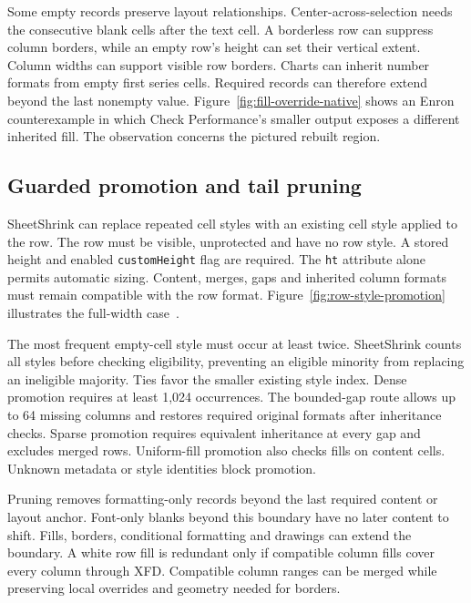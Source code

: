 Some empty records preserve layout relationships. Center-across-selection needs
the consecutive blank cells after the text cell. A borderless row can suppress
column borders, while an empty row's height can set their vertical extent. Column
widths can support visible row borders. Charts can inherit number formats from
empty first series cells. Required records can therefore extend beyond the last
nonempty value.
Figure~\ref{fig:fill-override-native} shows an Enron counterexample in which
Check Performance's smaller output exposes a different inherited fill. The
observation concerns the pictured rebuilt region.


\subsection{Guarded promotion and tail pruning}
SheetShrink can replace repeated cell styles with an existing cell style applied
to the row. The row must be visible, unprotected and have no row style. A stored
height and enabled \texttt{customHeight} flag are required. The \texttt{ht}
attribute alone permits automatic sizing. Content, merges, gaps and inherited
column formats must remain compatible with the row format.
Figure~\ref{fig:row-style-promotion} illustrates the full-width
case~\cite{rowpromotionfix}.


The most frequent empty-cell style must occur at least twice. SheetShrink counts
all styles before checking eligibility, preventing an eligible minority from
replacing an ineligible majority. Ties favor the smaller existing style index.
Dense promotion requires at least 1,024 occurrences. The bounded-gap route allows
up to 64 missing columns and restores required original formats after inheritance
checks. Sparse promotion requires equivalent inheritance at every gap and excludes
merged rows. Uniform-fill promotion also checks fills on content cells. Unknown
metadata or style identities block promotion.

Pruning removes formatting-only records beyond the last required content or
layout anchor. Font-only blanks beyond this boundary have no later content to
shift. Fills, borders, conditional formatting and drawings can extend the boundary.
A white row fill is redundant only if compatible column fills cover every column
through XFD. Compatible column ranges can be merged while preserving local
overrides and geometry needed for borders.

